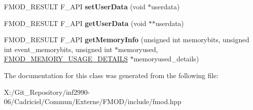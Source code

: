 \begin{DoxyCompactItemize}
\item 
\hypertarget{class_f_m_o_d_1_1_d_s_p_connection_ab3d3a0dc61be71656ee5b1b5d7dab50d}{F\-M\-O\-D\-\_\-\-R\-E\-S\-U\-L\-T F\-\_\-\-A\-P\-I {\bfseries set\-User\-Data} (void $\ast$userdata)}\label{class_f_m_o_d_1_1_d_s_p_connection_ab3d3a0dc61be71656ee5b1b5d7dab50d}

\item 
\hypertarget{class_f_m_o_d_1_1_d_s_p_connection_ad9db81fe98ee0eecb099a565d5ae2a4d}{F\-M\-O\-D\-\_\-\-R\-E\-S\-U\-L\-T F\-\_\-\-A\-P\-I {\bfseries get\-User\-Data} (void $\ast$$\ast$userdata)}\label{class_f_m_o_d_1_1_d_s_p_connection_ad9db81fe98ee0eecb099a565d5ae2a4d}

\item 
\hypertarget{class_f_m_o_d_1_1_d_s_p_connection_aaaf64c05107a635984495b8f4ba8a8fd}{F\-M\-O\-D\-\_\-\-R\-E\-S\-U\-L\-T F\-\_\-\-A\-P\-I {\bfseries get\-Memory\-Info} (unsigned int memorybits, unsigned int event\-\_\-memorybits, unsigned int $\ast$memoryused, \hyperlink{struct_f_m_o_d___m_e_m_o_r_y___u_s_a_g_e___d_e_t_a_i_l_s}{F\-M\-O\-D\-\_\-\-M\-E\-M\-O\-R\-Y\-\_\-\-U\-S\-A\-G\-E\-\_\-\-D\-E\-T\-A\-I\-L\-S} $\ast$memoryused\-\_\-details)}\label{class_f_m_o_d_1_1_d_s_p_connection_aaaf64c05107a635984495b8f4ba8a8fd}

\end{DoxyCompactItemize}


The documentation for this class was generated from the following file\-:\begin{DoxyCompactItemize}
\item 
X\-:/\-Git\-\_\-\-Repository/inf2990-\/06/\-Cadriciel/\-Commun/\-Externe/\-F\-M\-O\-D/include/fmod.\-hpp\end{DoxyCompactItemize}
